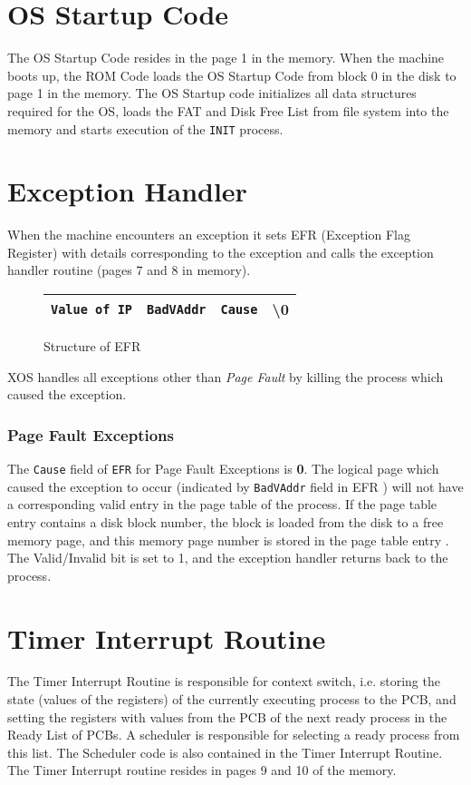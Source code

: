 \documentclass[10pt]{report}
\begin{document}
\section{OS Startup Code}
\label{sec:os startup code}
The OS Startup Code resides in the page 1 in the memory. When the machine boots up, the ROM Code loads the OS Startup Code from block 0 in the disk to page 1 in the memory. The OS Startup code initializes all data structures required for the OS, loads the FAT and Disk Free List from file system into the memory and starts execution of the \texttt{INIT} process.



\section{Exception Handler}
\label{sec:ex_handler}
When the machine encounters an exception it sets EFR (Exception Flag Register) with details corresponding to the exception and calls the exception handler routine (pages 7 and 8 in memory).


		\begin{figure}[htp!]
		\centering
		\begin{tabular}{|c|c|c|c|}
		\hline
		\texttt{Value of IP} & \texttt{BadVAddr} & \texttt{Cause} &  \textbackslash 0 \\
		\hline
		\end{tabular}
		\caption{Structure of EFR }
		\end{figure}
		
XOS handles all  exceptions other than \textit{Page Fault} by killing the process which caused the exception. 

\subsubsection{Page Fault Exceptions}
\label{sec:page fault}
The \texttt{Cause} field of \texttt{EFR} for Page Fault Exceptions is \textbf{0}. The logical page which caused the exception to occur (indicated by \texttt{BadVAddr} field in EFR ) will not have a corresponding valid entry in the page table of the process. If the page table entry contains a disk block number, the block is loaded from the disk to a free memory page, and this memory page number is stored in the page table entry . The Valid/Invalid bit is set to 1, and the exception handler returns back to the process.

 

\section{Timer Interrupt Routine}
\label{sec:timer}
The Timer Interrupt Routine is responsible for context switch, i.e. storing the state (values of the registers) of the currently executing process to the PCB, and setting the registers with values from the PCB of the next ready process in the Ready List of PCBs. A scheduler is responsible for selecting a ready process from this list. The Scheduler code is also contained in the Timer Interrupt Routine. The Timer Interrupt routine resides in pages 9 and 10 of the memory.
\end{document}
